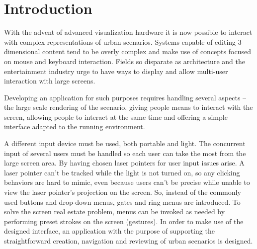 \chapter{Introduction}






With the advent of advanced visualization hardware it is now possible
to interact with complex representations of urban scenarios.
Systems capable of editing 3-dimensional content
tend to be overly complex and make use of concepts
focused on mouse and keyboard interaction.
Fields so disparate as architecture and the entertainment industry
urge to have ways to display and allow multi-user interaction with large screens.



Developing an application for such purposes requires handling several aspects
-- the large scale rendering of the scenario,
giving people means to interact with the screen,
allowing people to interact at the same time and
offering a simple interface adapted to the running environment.



A different input device must be used, both portable and light.
The concurrent input of several users must be handled so each user can
take the most from the large screen area.
By having chosen laser pointers for user input issues arise.
A laser pointer can't be tracked while the light is not turned on,
so any clicking behaviors are hard to mimic, even because users can't be 
precise while unable to view the laser pointer's projection on the screen.
So, instead of the commonly used buttons and drop-down menus,
gates and ring menus are introduced.
To solve the screen real estate problem, menus can be invoked as needed
by performing preset strokes on the screen (gestures).
In order to make use of the designed interface, an application with the
purpose of supporting the straightforward creation, navigation and reviewing of urban scenarios is designed.


